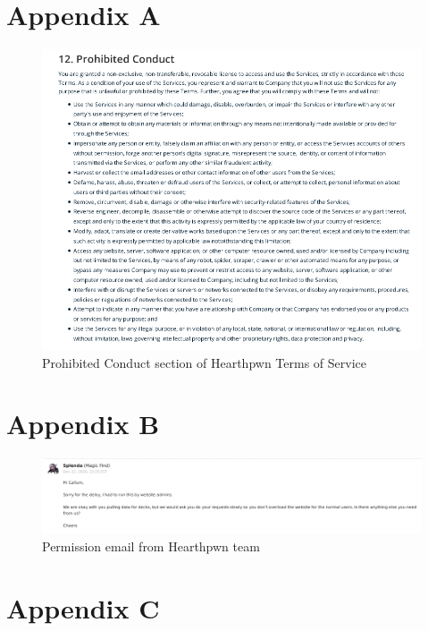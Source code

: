 \documentclass{report} %
\begin{document}
\section{Appendix A}
\begin{figure}[h]
\centering
\includegraphics[width=1.25\textwidth]{ProhibitedConduct}
\captionsetup{labelformat=empty}
\caption{Prohibited Conduct section of Hearthpwn Terms of Service\protect}
 \label{board}
\end{figure}


\section{Appendix B}
\begin{figure}[h]
\centering
\includegraphics[width=1.25\textwidth]{permission}
\captionsetup{labelformat=empty}
\caption{Permission email from Hearthpwn team\protect\footnotemark}
 \label{board}
\end{figure}

\section{Appendix C}

\end{document}
